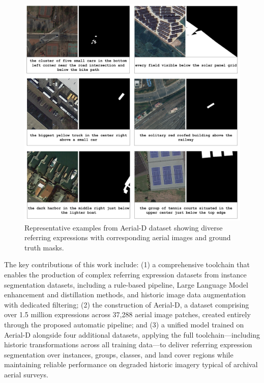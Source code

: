 \begingroup
\setlength{\intextsep}{6pt}
\setlength{\abovecaptionskip}{2pt}
\setlength{\belowcaptionskip}{0pt}
\begin{figure}[H]
\centering
\includegraphics[width=\columnwidth]{./images/6samples.png}
\caption{Representative examples from Aerial-D dataset showing diverse referring expressions with corresponding aerial images and ground truth masks.}
\label{fig:dataset_examples}
\end{figure}
\endgroup


The key contributions of this work include: (1) a comprehensive toolchain that enables the production of complex referring expression datasets from instance segmentation datasets, including a rule-based pipeline, Large Language Model enhancement and distillation methods, and historic image data augmentation with dedicated filtering; (2) the construction of Aerial-D, a dataset comprising over 1.5 million expressions across 37,288 aerial image patches, created entirely through the proposed automatic pipeline; and (3) a unified model trained on Aerial-D alongside four additional datasets, applying the full toolchain—including historic transformations across all training data—to deliver referring expression segmentation over instances, groups, classes, and land cover regions while maintaining reliable performance on degraded historic imagery typical of archival aerial surveys.
